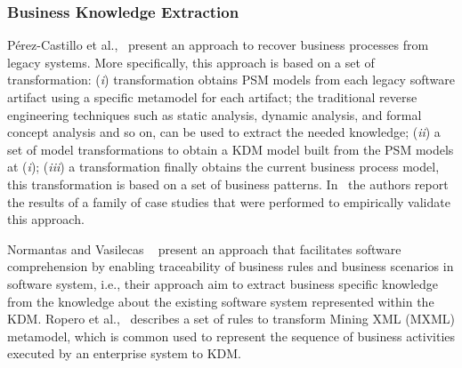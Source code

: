 \subsubsection{Business Knowledge Extraction}
\label{ssub:Business_Knowledge_Extraction}

 P\'{e}rez-Castillo et al.,~\cite{Perez-Castillo:2011:ECS:1982185.1982249,6080834, 6498507,Perez-Castillo:2010:IBP:1875847.1875861} present an approach to recover business processes from legacy systems. More specifically, this approach is based on a set of transformation: (\textit{i}) transformation obtains PSM models from each legacy software artifact using a specific metamodel for each artifact; the traditional reverse engineering techniques such as static analysis, dynamic analysis, and formal concept analysis and so on, can be used to extract the needed knowledge; (\textit{ii}) a set of model transformations to obtain a KDM model built from the PSM models at (\textit{i}); (\textit{iii}) a transformation finally obtains the current business process model, this transformation is based on a set of business patterns. In~\cite{PerezCastillo20121370} the authors report the results of a family of case studies that were performed to empirically validate this approach. %

Normantas and Vasilecas ~\cite{lastDAyOFMyLife} present an approach that facilitates software comprehension by enabling traceability of business rules and business scenarios in software system, i.e., their approach aim to extract business specific knowledge from the knowledge about the existing software system represented within the KDM. Ropero et al.,~\cite{Fernandez-Ropero:2012:EAB:2367051.2367064} describes a set of rules to transform Mining XML (MXML) metamodel, which is common used to represent the sequence of business activities executed by an enterprise system to KDM. %


